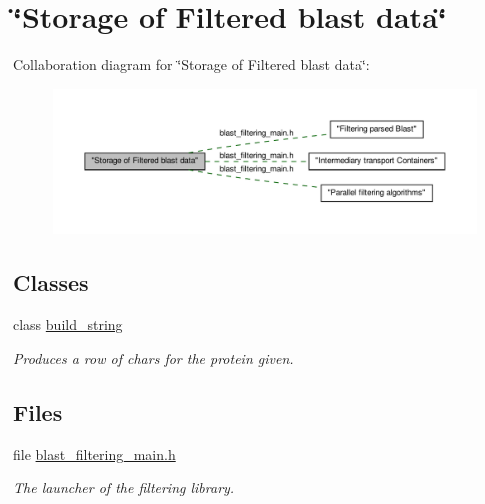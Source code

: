 \hypertarget{group__filter__container}{
\section{\char`\"{}Storage of Filtered blast data\char`\"{}}
\label{group__filter__container}
}
Collaboration diagram for \char`\"{}Storage of Filtered blast data\char`\"{}:\nopagebreak
\begin{figure}[H]
\begin{center}
\leavevmode
\includegraphics[width=400pt]{group__filter__container}
\end{center}
\end{figure}
\subsection*{Classes}
\begin{DoxyCompactItemize}
\item 
class \hyperlink{classbuild__string}{build\_\-string}
\begin{DoxyCompactList}\small\item\em Produces a row of chars for the protein given. \end{DoxyCompactList}\end{DoxyCompactItemize}
\subsection*{Files}
\begin{DoxyCompactItemize}
\item 
file \hyperlink{blast__filtering__main_8h}{blast\_\-filtering\_\-main.h}


\begin{DoxyCompactList}\small\item\em The launcher of the filtering library. \end{DoxyCompactList}

\end{DoxyCompactItemize}
